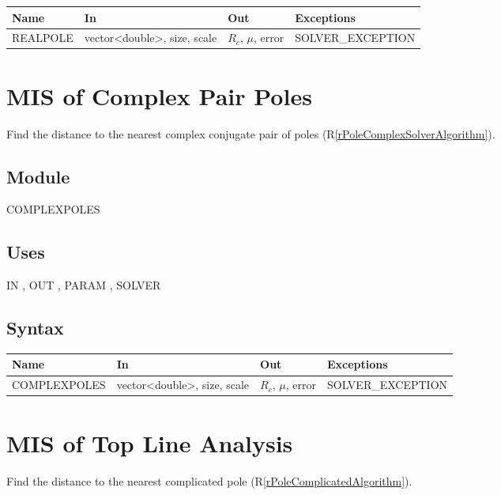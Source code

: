 \documentclass[12pt, titlepage]{article}
\newcommand{\rref}[1]{(R\ref{#1})}
\begin{document}
\begin{tabular}{p{3cm} p{5cm} p{3cm} >{\raggedright\arraybackslash}p{5cm}}
\toprule
\textbf{Name} & \textbf{In} & \textbf{Out} & \textbf{Exceptions} \\
\midrule
  REALPOLE & vector<double>, size, scale &  $R_c$, $\mu$, error & SOLVER\_EXCEPTION \\
\bottomrule
\end{tabular}

\section{MIS of Complex Pair Poles} \label{sc:MIS_POLECOMPLEXSOLVERMODULE}

Find the distance to the nearest complex conjugate pair of poles \rref{rPoleComplexSolverAlgorithm}.

\subsection{Module}

COMPLEXPOLES

\subsection{Uses}

IN , OUT , PARAM , SOLVER 

\subsection{Syntax}

\begin{tabular}{p{3.5cm} p{5cm} p{3cm} >{\raggedright\arraybackslash}p{5cm}}
\toprule
\textbf{Name} & \textbf{In} & \textbf{Out} & \textbf{Exceptions} \\
\midrule
  COMPLEXPOLES & vector<double>, size, scale &  $R_c$, $\mu$, error & SOLVER\_EXCEPTION \\
\bottomrule
\end{tabular}

\section{MIS of Top Line Analysis} \label{sc:MIS_POLETOPLINEMODULE}

Find the distance to the nearest complicated pole \rref{rPoleComplicatedAlgorithm}.
\end{document}

